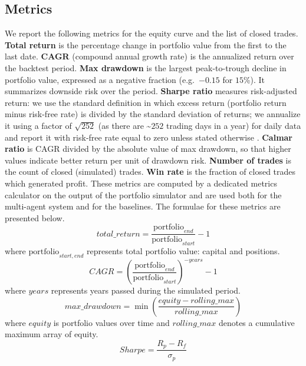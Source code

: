 \documentclass{icis}
\begin{document}
\subsection{Metrics}

We report the following metrics for the equity curve and the list of closed trades. \textbf{Total return}\label{metric:return} is the percentage change in portfolio value from the first to the last date. \textbf{CAGR} (compound annual growth rate) is the annualized return over the backtest period. \textbf{Max drawdown} is the largest peak-to-trough decline in portfolio value, expressed as a negative fraction (e.g.\ $-0.15$ for $15$\%). It summarizes downside risk over the period. \textbf{Sharpe ratio} measures risk-adjusted return: we use the standard definition in which excess return (portfolio return minus risk-free rate) is divided by the standard deviation of returns; we annualize it using a factor of $\sqrt{252}$ (as there are \~{}$252$ trading days in a year) for daily data and report it with risk-free rate equal to zero unless stated otherwise \autocite{sharpe1966}. \textbf{Calmar ratio} is CAGR divided by the absolute value of max drawdown, so that higher values indicate better return per unit of drawdown risk. \textbf{Number of trades} is the count of closed (simulated) trades. \textbf{Win rate} is the fraction of closed trades which generated profit. These metrics are computed by a dedicated metrics calculator on the output of the portfolio simulator and are used both for the multi-agent system and for the baselines. The formulae for these metrics are presented below.
\begin{equation}
    total\_return =
    \frac{\text{portfolio}_{end}}{\text{portfolio}_{start}} - 1
\end{equation}
where $\text{portfolio}_{start,end}$ represents total portfolio value: capital and positions.
\begin{equation}
    CAGR =
    \left( \dfrac{\text{portfolio}_{end}}{\text{portfolio}_{start}} \right)^{-years} - 1
\end{equation}
where $years$ represents years passed during the simulated period.
\begin{equation}
    max\_drawdown =
    \min\!\left( \dfrac{equity - rolling\_max}{rolling\_max} \right)
\end{equation}
where $equity$ is portfolio values over time and $rolling\_max$ denotes a cumulative maximum array of equity.
\begin{equation}
    Sharpe = \frac{R_p - R_f}{\sigma_p}
\end{equation}
\end{document}
